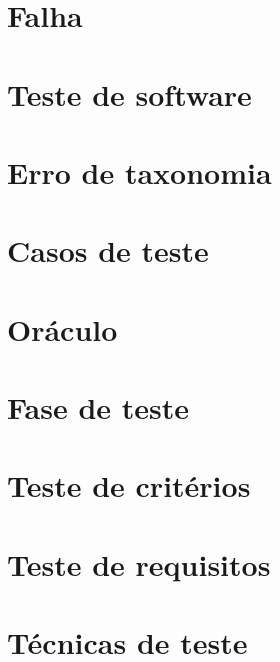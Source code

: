\documentclass[utf8, usepdftitle=false, svgnames, color={table, fixpdftex, hyperref, fixinclude, xcdraw}, t, brazil]{beamer}
\begin{document}
		\section{Falha}
		

		\section{Teste de software}
		

		\section{Erro de taxonomia}
		

		\section{Casos de teste}
		

		\section{Oráculo}
		

		\section{Fase de teste}
		

		\section{Teste de critérios}
		

		\section{Teste de requisitos}
		

		\section{Técnicas de teste}
		 
\end{document}
